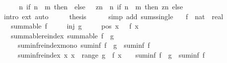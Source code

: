 \begin{isabellebody}
%
\isadelimproof
%
\endisadelimproof
%
\isatagproof
{}\isamarkupfalse%
\ {\isacharminus}{\kern0pt}\isanewline
\ \ \isamarkupfalse%
\ {\isachardoublequoteopen}{\isacharparenleft}{\kern0pt}{\isasymlambda}n{\isachardot}{\kern0pt}\ {\isacharparenleft}{\kern0pt}if\ n\ {\isacharequal}{\kern0pt}\ m\ then\ {}\ else\ {}{\isacharparenright}{\kern0pt}\ {\isacharasterisk}{\kern0pt}\ z{\isacharcircum}{\kern0pt}n{\isacharparenright}{\kern0pt}\ {\isacharequal}{\kern0pt}\ {\isacharparenleft}{\kern0pt}{\isasymlambda}n{\isachardot}{\kern0pt}\ if\ n\ {\isacharequal}{\kern0pt}\ m\ then\ z{\isacharcircum}{\kern0pt}n\ else\ {}{\isacharparenright}{\kern0pt}{\isachardoublequoteclose}\isanewline
\ \ \ \ \isamarkupfalse%
\ {\isacharparenleft}{\kern0pt}intro\ ext{\isacharparenright}{\kern0pt}\ auto\isanewline
\ \ \isamarkupfalse%
\ \isamarkupfalse%
\ {\isacharquery}{\kern0pt}thesis\isanewline
\ \ \ \ \isamarkupfalse%
\ {\isacharparenleft}{\kern0pt}simp\ add{\isacharcolon}{\kern0pt}\ sums{\isacharunderscore}{\kern0pt}single{\isacharparenright}{\kern0pt}\isanewline
{}\isamarkupfalse%
%
\endisatagproof
{\isafoldproof}%
%
\isadelimproof
\isanewline
%
\endisadelimproof
\isanewline
{}\isamarkupfalse%
\isanewline
\ \ \ f\ {\isacharcolon}{\kern0pt}{\isacharcolon}{\kern0pt}\ {\isachardoublequoteopen}nat\ {\isasymRightarrow}\ real{\isachardoublequoteclose}\isanewline
\ \ \ {\isachardoublequoteopen}summable\ f{\isachardoublequoteclose}\isanewline
\ \ \ \ \ {\isachardoublequoteopen}inj\ g{\isachardoublequoteclose}\isanewline
\ \ \ \ \ pos{\isacharcolon}{\kern0pt}\ {\isachardoublequoteopen}{\isasymAnd}x{\isachardot}{\kern0pt}\ {}\ {\isasymle}\ f\ x{\isachardoublequoteclose}\isanewline
\ \ \ summable{\isacharunderscore}{\kern0pt}reindex{\isacharcolon}{\kern0pt}\ {\isachardoublequoteopen}summable\ {\isacharparenleft}{\kern0pt}f\ {\isasymcirc}\ g{\isacharparenright}{\kern0pt}{\isachardoublequoteclose}\isanewline
\ \ \ \ \ suminf{\isacharunderscore}{\kern0pt}reindex{\isacharunderscore}{\kern0pt}mono{\isacharcolon}{\kern0pt}\ {\isachardoublequoteopen}suminf\ {\isacharparenleft}{\kern0pt}f\ {\isasymcirc}\ g{\isacharparenright}{\kern0pt}\ {\isasymle}\ suminf\ f{\isachardoublequoteclose}\isanewline
\ \ \ \ \ suminf{\isacharunderscore}{\kern0pt}reindex{\isacharcolon}{\kern0pt}\ {\isachardoublequoteopen}{\isacharparenleft}{\kern0pt}{\isasymAnd}x{\isachardot}{\kern0pt}\ x\ {\isasymnotin}\ range\ g\ {\isasymLongrightarrow}\ f\ x\ {\isacharequal}{\kern0pt}\ {}{\isacharparenright}{\kern0pt}\ {\isasymLongrightarrow}\ suminf\ {\isacharparenleft}{\kern0pt}f\ {\isasymcirc}\ g{\isacharparenright}{\kern0pt}\ {\isacharequal}{\kern0pt}\ suminf\ f{\isachardoublequoteclose}\isanewline

\end{isabellebody}
